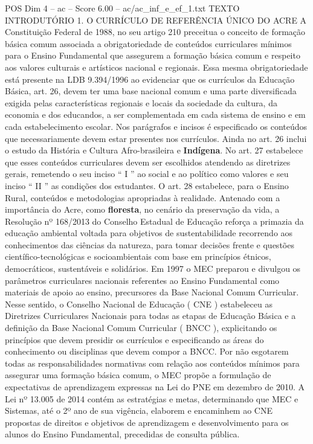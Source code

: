 \begin{textsample}{POS Dim 4 – ac – Score 6.00 – ac/ac\_inf\_e\_ef\_1.txt}  \label{ex:f4_pos_245}
TEXTO INTRODUTÓRIO 1.
O CURRÍCULO DE REFERÊNCIA ÚNICO DO ACRE A Constituição Federal de 1988, no seu artigo 210 preceitua o conceito de formação básica comum associada a obrigatoriedade de conteúdos curriculares mínimos para o Ensino Fundamental que assegurem a formação básica comum e respeito aos valores culturais e artísticos nacional e regionais.
Essa mesma obrigatoriedade está presente na LDB 9.394/1996 ao evidenciar que os currículos da Educação Básica, art. 26, devem ter uma base nacional comum e uma parte diversificada exigida pelas características regionais e locais da sociedade da cultura, da economia e dos educandos, a ser complementada em cada sistema de ensino e em cada estabelecimento escolar.
Nos parágrafos e incisos é especificado os conteúdos que necessariamente devem estar presentes nos currículos.
Ainda no art. 26 inclui o estudo da História e Cultura Afro-brasileira e \textbf{Indígena}.
No art. 27 estabelece que esses conteúdos curriculares devem ser escolhidos atendendo as diretrizes gerais, remetendo o seu inciso “ I ” ao social e ao político como valores e seu inciso “ II ” as condições dos estudantes.
O art. 28 estabelece, para o Ensino Rural, conteúdos e metodologias apropriadas à realidade.
Antenado com a importância do Acre, como \textbf{floresta}, no cenário da preservação da vida, a Resolução nº 168/2013 do Conselho Estadual de Educação reforça a primazia da educação ambiental voltada para objetivos de sustentabilidade recorrendo aos conhecimentos das ciências da natureza, para tomar decisões frente e questões científico-tecnológicas e socioambientais com base em princípios étnicos, democráticos, sustentáveis e solidários.
Em 1997 o MEC preparou e divulgou os parâmetros curriculares nacionais referentes ao Ensino Fundamental como materiais de apoio ao ensino, precursores da Base Nacional Comum Curricular.
Nesse sentido, o Conselho Nacional de Educação ( CNE ) estabeleceu as Diretrizes Curriculares Nacionais para todas as etapas de Educação Básica e a definição da Base Nacional Comum Curricular ( BNCC ), explicitando os princípios que devem presidir os currículos e especificando as áreas do conhecimento ou disciplinas que devem compor a BNCC.
Por não esgotarem todas as responsabilidades normativas com relação aos conteúdos mínimos para assegurar uma formação básica comum, o MEC propõe a formulação de expectativas de aprendizagem expressas na Lei do PNE em dezembro de 2010.
A Lei nº 13.005 de 2014 contém as estratégias e metas, determinando que MEC e Sistemas, até o 2º ano de sua vigência, elaborem e encaminhem ao CNE propostas de direitos e objetivos de aprendizagem e desenvolvimento para os alunos do Ensino Fundamental, precedidas de consulta pública.

\end{textsample}
